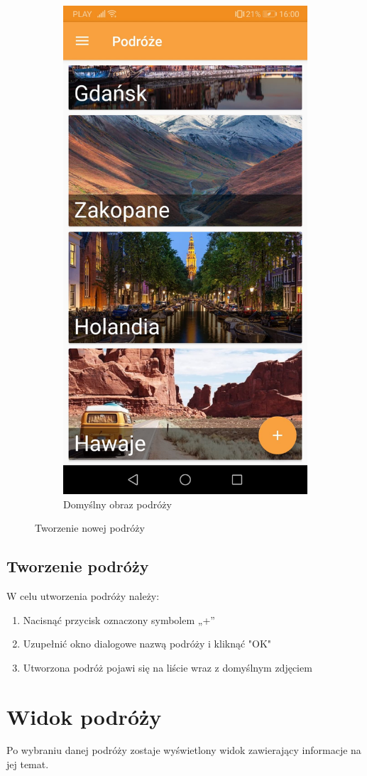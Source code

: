 \documentclass[10pt,twoside,a4paper]{report}
\begin{document}
\begin{figure}[h]
\begin{subfigure}{0.3\textwidth}
\includegraphics[width=0.8\linewidth, width=5cm]{defaultImage}
\caption{Domyślny obraz podróży}
\label{fig:defaultImage}
\end{subfigure}
\caption{Tworzenie nowej podróży}
\label{fig:podrecznik3}
\end{figure}

\subsection{Tworzenie podróży}
W celu utworzenia podróży należy:
\begin{enumerate}
\item Nacisnąć przycisk oznaczony symbolem „+”
\item Uzupełnić okno dialogowe nazwą podróży i kliknąć "OK"
\item Utworzona podróż pojawi się na liście wraz z domyślnym zdjęciem
\end{enumerate}


\section{Widok podróży}
Po wybraniu danej podróży zostaje wyświetlony widok zawierający informacje na jej temat.
\end{document}
